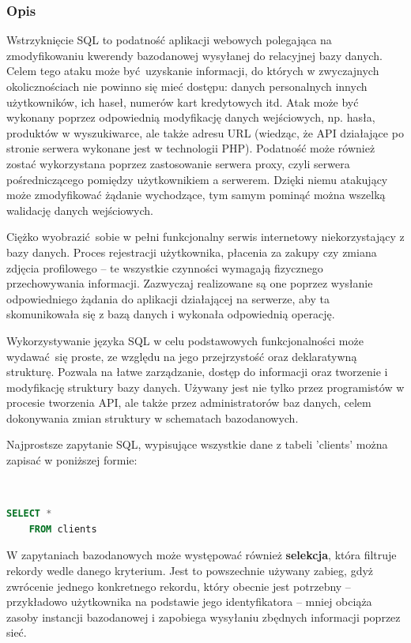 \documentclass[12pt,twoside]{article}
\begin{document}
\subsubsection{Opis}

Wstrzyknięcie SQL to podatność aplikacji webowych polegająca na zmodyfikowaniu kwerendy bazodanowej wysyłanej do relacyjnej bazy danych. Celem tego ataku może być uzyskanie informacji, do których w zwyczajnych okolicznościach nie powinno się mieć dostępu: danych personalnych innych użytkowników, ich haseł, numerów kart kredytowych itd. Atak może być wykonany poprzez odpowiednią modyfikację danych wejściowych, np. hasła, produktów w wyszukiwarce, ale także adresu URL (wiedząc, że API działające po stronie serwera wykonane jest w technologii PHP). Podatność może również zostać wykorzystana poprzez zastosowanie serwera proxy, czyli serwera pośredniczącego pomiędzy użytkownikiem a serwerem. Dzięki niemu atakujący może zmodyfikować żądanie wychodzące, tym samym pominąć można wszelką walidację danych wejściowych. 

Ciężko wyobrazić sobie w pełni funkcjonalny serwis internetowy niekorzystający z bazy danych. Proces rejestracji użytkownika, płacenia za zakupy czy zmiana zdjęcia profilowego -- te wszystkie czynności wymagają fizycznego przechowywania informacji. Zazwyczaj realizowane są one poprzez wysłanie odpowiedniego żądania do aplikacji działającej na serwerze, aby ta skomunikowała się z bazą danych i wykonała odpowiednią operację. 

Wykorzystywanie języka SQL w celu podstawowych funkcjonalności może wydawać się proste, ze względu na jego przejrzystość oraz deklaratywną strukturę. Pozwala na łatwe zarządzanie, dostęp do informacji oraz tworzenie i modyfikację struktury bazy danych. Używany jest nie tylko przez programistów w procesie tworzenia API, ale także przez administratorów baz danych, celem dokonywania zmian struktury w schematach bazodanowych.

Najprostsze zapytanie SQL, wypisujące wszystkie dane z tabeli 'clients' można zapisać w poniższej formie:

\

\begin{lstlisting}[language=SQL,caption=Zwrócenie zawartości tabeli 'clients',label={KodSQL1}]
	SELECT * 
	FROM clients
\end{lstlisting}

W zapytaniach bazodanowych może występować również \textbf{selekcja}, która filtruje rekordy wedle danego kryterium. Jest to powszechnie używany zabieg, gdyż zwrócenie jednego konkretnego rekordu, który obecnie jest potrzebny -- przykładowo użytkownika na podstawie jego identyfikatora -- mniej obciąża zasoby instancji bazodanowej i zapobiega wysyłaniu zbędnych informacji poprzez sieć.
\end{document}

